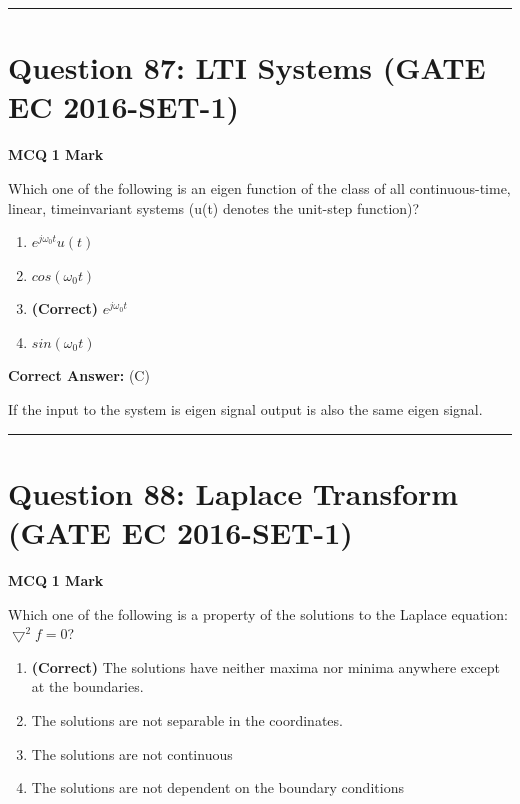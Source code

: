\documentclass[11pt,a4paper]{article}
\begin{document}
\vspace{1.5em}
\hrule
\vspace{1.5em}

\section*{Question 87: LTI Systems (GATE EC 2016-SET-1)}
\noindent \textbf{\color{primary}MCQ} \hfill \textbf{\color{secondary}1 Mark}


\noindent Which one of the following is an eigen function of the class of all continuous-time, linear, timeinvariant systems (u(t) denotes the unit-step function)?


\begin{enumerate}[label=(\Alph*)]
    \item $e^{j\omega_{0}t }u(t)$
    \item $cos(\omega _{0}t)$
    \item \textbf{(Correct)} $e^{j\omega_{0}t }$
    \item $sin(\omega _{0}t)$
\end{enumerate}

\noindent \textbf{Correct Answer:} (C)

\begin{tcolorbox}[solbox, title=Detailed Solution -- Question 87]
If the input to the system is eigen signal output is also the same eigen signal.
\end{tcolorbox}

\vspace{1.5em}
\hrule
\vspace{1.5em}

\section*{Question 88: Laplace Transform (GATE EC 2016-SET-1)}
\noindent \textbf{\color{primary}MCQ} \hfill \textbf{\color{secondary}1 Mark}


\noindent Which one of the following is a property of the solutions to the Laplace equation: $\bigtriangledown ^{2} f= 0$?


\begin{enumerate}[label=(\Alph*)]
    \item \textbf{(Correct)} The solutions have neither maxima nor minima anywhere except at the boundaries.
    \item The solutions are not separable in the coordinates.
    \item The solutions are not continuous
    \item The solutions are not dependent on the boundary conditions
\end{enumerate}
\end{document}
